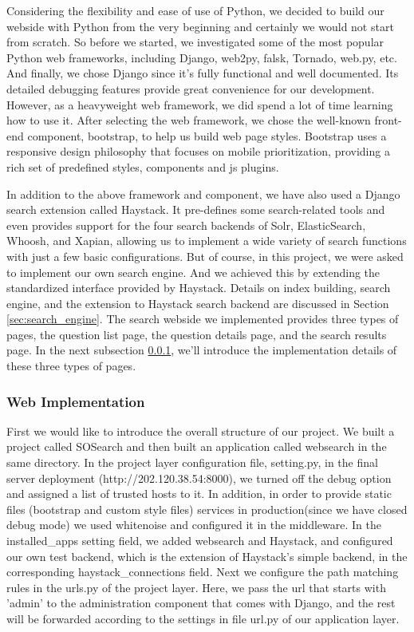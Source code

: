 \documentclass[10pt,journal,compsoc]{IEEEtran}
\begin{document}
Considering the flexibility and ease of use of Python, we decided to build our webside with Python from the very beginning and certainly we would not start from scratch. So before we started, we investigated some of the most popular Python web frameworks, including Django, web2py, falsk, Tornado, web.py, etc. And finally, we chose Django since it's fully functional and well documented. Its detailed debugging features provide great convenience for our development. However, as a heavyweight web framework, we did spend a lot of time learning how to use it. After selecting the web framework, we chose the well-known front-end component, bootstrap, to help us build web page styles. Bootstrap uses a responsive design philosophy that focuses on mobile prioritization, providing a rich set of predefined styles, components and js plugins.

In addition to the above framework and component, we have also used a Django search extension called Haystack. It pre-defines some search-related tools and even provides support for the four search backends of Solr, ElasticSearch, Whoosh, and Xapian, allowing us to implement a wide variety of search functions with just a few basic configurations. But of course, in this project, we were asked to implement our own search engine. And we achieved this by extending the standardized  interface provided by Haystack. Details on index building, search engine, and the extension to Haystack search backend are discussed in Section \ref{sec:search_engine}. The search webside we implemented provides three types of pages, the question list page, the question details page, and the search results page. In the next subsection \ref{subsubsec:web_implementation}, we'll introduce the implementation details of these three types of pages.

\subsubsection{Web Implementation}
\label{subsubsec:web_implementation}

First we would like to introduce the overall structure of our project. We built a project called SOSearch and then built an application called websearch in the same directory. In the project layer configuration file, setting.py, in the final server deployment (http://202.120.38.54:8000), we turned off the debug option and assigned a list of trusted hosts to it. In addition, in order to provide static files (bootstrap and custom style files) services in production(since we have closed debug mode) we used whitenoise and configured it in the middleware. In the installed\_apps setting field, we added websearch and Haystack, and configured our own test backend, which is the extension of Haystack's simple backend, in the corresponding haystack\_connections field. Next we configure the path matching rules in the urls.py of the project layer. Here, we pass the url that starts with 'admin' to the administration component that comes with Django, and the rest will be forwarded according to the settings in file url.py of our application layer. 
\end{document}
